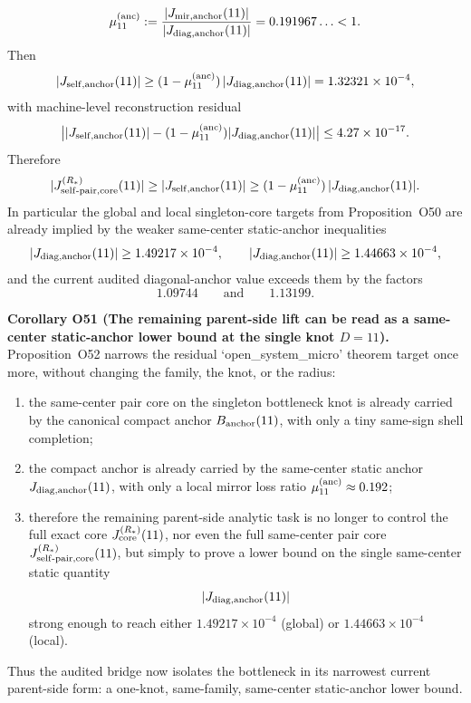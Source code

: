 \documentclass[aps,prd,onecolumn,notitlepage,nofootinbib,superscriptaddress,11pt,floatfix]{revtex4-2}
\begin{document}
\[
\mu_{11}^{\rm(anc)}
:=
\frac{|J_{{\rm mir},\rm anchor}(11)|}{|J_{{\rm diag},\rm anchor}(11)|}
=
0.191967\ldots<1.
\]
Then
\[
|J_{{\rm self},\rm anchor}(11)|
\ge
(1-\mu_{11}^{\rm(anc)})\,|J_{{\rm diag},\rm anchor}(11)|
=
1.32321\times10^{-4},
\]
with machine-level reconstruction residual
\[
\bigl||J_{{\rm self},\rm anchor}(11)|-(1-\mu_{11}^{\rm(anc)})|J_{{\rm diag},\rm anchor}(11)|\bigr|
\le 4.27\times10^{-17}.
\]
Therefore
\[
|J_{{\rm self\text{-}pair},{\rm core}}^{(R_\ast)}(11)|
\ge
|J_{{\rm self},\rm anchor}(11)|
\ge
(1-\mu_{11}^{\rm(anc)})\,|J_{{\rm diag},\rm anchor}(11)|.
\]
In particular the global and local singleton-core targets from Proposition~O50 are already implied by the weaker same-center static-anchor inequalities
\[
|J_{{\rm diag},\rm anchor}(11)|\ge 1.49217\times10^{-4},
\qquad
|J_{{\rm diag},\rm anchor}(11)|\ge 1.44663\times10^{-4},
\]
and the current audited diagonal-anchor value exceeds them by the factors
\[
1.09744
\qquad\text{and}\qquad
1.13199.
\]

\medskip\noindent\textbf{Corollary O51 (The remaining parent-side lift can be read as a same-center static-anchor lower bound at the single knot \(D=11\)).}
Proposition~O52 narrows the residual `open\_system\_micro' theorem target once more, without changing the family, the knot, or the radius:
\begin{enumerate}
\item the same-center pair core on the singleton bottleneck knot is already carried by the canonical compact anchor \(B_{\rm anchor}(11)\), with only a tiny same-sign shell completion;
\item the compact anchor is already carried by the same-center static anchor \(J_{{\rm diag},\rm anchor}(11)\), with only a local mirror loss ratio \(\mu_{11}^{\rm(anc)}\approx0.192\);
\item therefore the remaining parent-side analytic task is no longer to control the full exact core \(J_{\rm core}^{(R_\ast)}(11)\), nor even the full same-center pair core \(J_{{\rm self\text{-}pair},{\rm core}}^{(R_\ast)}(11)\), but simply to prove a lower bound on the single same-center static quantity
\[
|J_{{\rm diag},\rm anchor}(11)|
\]
strong enough to reach either \(1.49217\times10^{-4}\) (global) or \(1.44663\times10^{-4}\) (local).
\end{enumerate}
Thus the audited bridge now isolates the bottleneck in its narrowest current parent-side form: a one-knot, same-family, same-center static-anchor lower bound.
\end{document}
